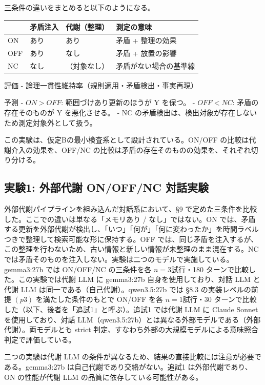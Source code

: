 \documentclass[12pt,a4paper]{article}
\begin{document}
三条件の違いをまとめると以下のようになる。

{\def\LTcaptype{table} %
\begin{longtable}[]{@{}llll@{}}
\toprule\noalign{}
& 矛盾注入 & 代謝（整理） & 測定の意味 \\
\midrule\noalign{}
\endhead
\bottomrule\noalign{}
\endlastfoot
ON & あり & あり & 矛盾 + 整理の効果 \\
OFF & あり & なし & 矛盾 + 放置の影響 \\
NC & なし & （対象なし） & 矛盾がない場合の基準線 \\
\end{longtable}
}

評価 - 論理一貫性維持率（規則適用・矛盾検出・事実再現）

予測 - \(ON > OFF\): 範囲づけあり更新のほうが Y を保つ。 - \(OFF < NC\): 矛盾の存在そのものが Y を悪化させる。 - NC の矛盾検出は、検出対象が存在しないため測定対象外として扱う。

この実験は、仮定Bの最小検査系として設計されている。ON/OFF の比較は代謝介入の効果を、OFF/NC の比較は矛盾の存在そのものの効果を、それぞれ切り分ける。

\subsection{実験1: 外部代謝 ON/OFF/NC 対話実験}\label{ux5b9fux9a131-ux5916ux90e8ux4ee3ux8b1d-onoffnc-ux5bfeux8a71ux5b9fux9a13}

外部代謝パイプラインを組み込んだ対話系において、§9 で定めた三条件を比較した。ここでの違いは単なる「メモリあり / なし」ではない。ON では、矛盾する更新を外部代謝が検出し、「いつ」「何が」「何に変わったか」を時間ラベルつきで整理して検索可能な形に保持する。OFF では、同じ矛盾を注入するが、この整理を行わないため、古い情報と新しい情報が未整理のまま混在する。NC では矛盾そのものを注入しない。実験は二つのモデルで実施している。gemma3:27b では ON/OFF/NC の三条件を各 \(n=3\)試行・180 ターンで比較した。この実験では代謝 LLM に gemma3:27b 自身を使用しており、対話 LLM と代謝 LLM は同一である（自己代謝）。qwen3.5:27b では §8.3 の実装レベルの前提 \((p3)\) を満たした条件のもとで ON/OFF を各 \(n=1\)試行・30 ターンで比較した（以下、後者を「追試1」と呼ぶ）。追試1 では代謝 LLM に Claude Sonnet を使用しており、対話 LLM（qwen3.5:27b）とは異なる外部モデルである（外部代謝）。両モデルとも strict 判定、すなわち外部の大規模モデルによる意味照合判定で評価している。

二つの実験は代謝 LLM の条件が異なるため、結果の直接比較には注意が必要である。gemma3:27b は自己代謝であり交絡がない。追試1 は外部代謝であり、ON の性能が代謝 LLM の品質に依存している可能性がある。
\end{document}
